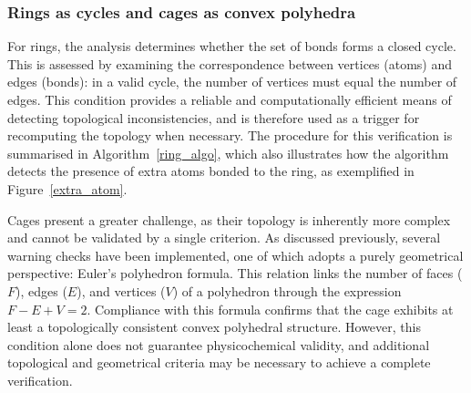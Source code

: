 \subsubsection{Rings as cycles and cages as convex polyhedra}\label{graph_theory}

For rings, the analysis determines whether the set of bonds forms a closed
cycle. This is assessed by examining the correspondence between vertices
(atoms) and edges (bonds): in a valid cycle, the number of vertices must equal
the number of edges. This condition provides a reliable and computationally
efficient means of detecting topological inconsistencies, and is therefore used
as a trigger for recomputing the topology when necessary. The procedure for
this verification is summarised in Algorithm~\ref{ring_algo}, which also
illustrates how the algorithm detects the presence of extra atoms bonded to the
ring, as exemplified in Figure~\ref{extra_atom}.

Cages present a greater challenge, as their topology is inherently more complex
and cannot be validated by a single criterion. As discussed previously, several
warning checks have been implemented, one of which adopts a purely geometrical
perspective: Euler's polyhedron formula. This relation links the number of
faces ($F$), edges ($E$), and vertices ($V$) of a polyhedron through the
expression $F - E + V = 2$. Compliance with this formula confirms that the cage
exhibits at least a topologically consistent convex polyhedral structure.
However, this condition alone does not guarantee physicochemical validity, and
additional topological and geometrical criteria may be necessary to achieve a
complete verification.

